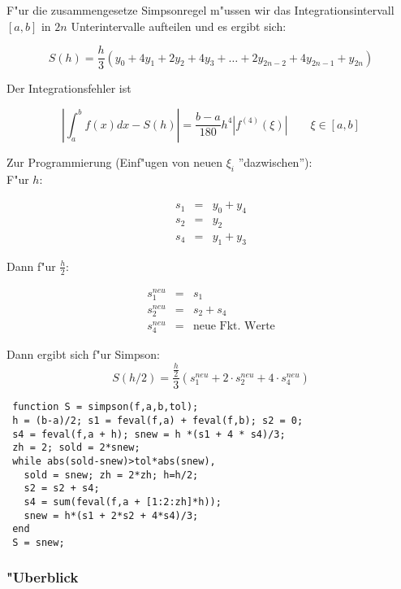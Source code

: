 \documentclass[german, 10pt, a4paper, twocolumn]{scrartcl}
\theoremstyle{definition}
\begin{document}
F"ur die zusammengesetze Simpsonregel m"ussen wir das Integrationsintervall $[a,b]$ in $2n$ Unterintervalle aufteilen und es ergibt sich:

\begin{displaymath}
	S(h) = \frac{h}{3} (y_0 + 4y_1 + 2 y_2 + 4 y_3 + \hdots + 2 y_{2n-2} + 4 y_{2n-1} + y_{2n} )
\end{displaymath}

Der Integrationsfehler ist

\begin{displaymath}
	\left | \int^b_a f(x) dx - S(h) \right | = \frac{b-a}{180} h^4 \left | f^{(4)}(\xi) \right | \qquad \xi \in [a,b]
\end{displaymath}

Zur Programmierung (Einf"ugen von neuen $\xi_i$ ''dazwischen''):\\

F"ur $h$:

\begin{eqnarray*}
	s_1 &	= &	y_0 + y_4\\
	s_2 &	= &	y_2\\
	s_4 &	= &	y_1 + y_3
\end{eqnarray*}

Dann f"ur $\frac{h}{2}$:

\begin{eqnarray*}
	s_1^{neu}&	= &	s_1\\
	s_2^{neu}&	= &	s_2 + s_4\\
	s_4^{neu}&	= &	\mbox{neue Fkt. Werte}
\end{eqnarray*}

Dann ergibt sich f"ur Simpson:
\begin{displaymath}
	S ( h/2 ) = \frac{\frac{h}{2}}{3} (s_1^{neu} + 2\cdotp s_2^{neu} + 4\cdotp s_4^{neu})
\end{displaymath}

\small
\begin{verbatim}
 function S = simpson(f,a,b,tol);
 h = (b-a)/2; s1 = feval(f,a) + feval(f,b); s2 = 0;
 s4 = feval(f,a + h); snew = h *(s1 + 4 * s4)/3;
 zh = 2; sold = 2*snew;
 while abs(sold-snew)>tol*abs(snew),
   sold = snew; zh = 2*zh; h=h/2;
   s2 = s2 + s4;
   s4 = sum(feval(f,a + [1:2:zh]*h));
   snew = h*(s1 + 2*s2 + 4*s4)/3;
 end
 S = snew;
\end{verbatim}
\normalsize

\subsubsection{"Uberblick}
\end{document}
